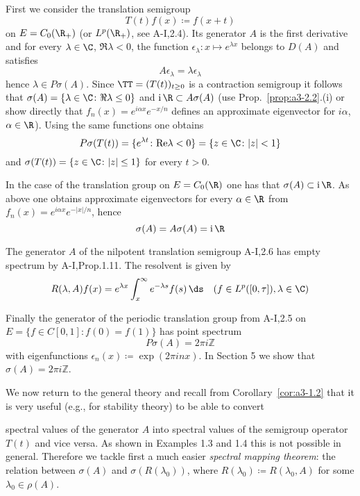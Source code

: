 First we consider the translation semigroup
\[
T(t)f(x) \coloneqq f(x+t)
\]
on $E = C_{0}(\R_{+})$ (or $L^{p}(\R_{+})$, see A-I,2.4).
Its generator $A$ is the first derivative and for every $\lambda \in \C$, $\Re\lambda < 0$, the function $\epsilon_{\lambda} \colon x \mapsto e^{\lambda x}$ belongs to $D(A)$ and satisfies
\[
A\epsilon_{\lambda} = \lambda\epsilon_{\lambda}
\]
hence $\lambda \in P\sigma(A)$.
Since $\TT = (T(t))_{t \geq 0}$ is a contraction semigroup it follows that $\sigma(A) = \{\lambda \in \C \colon \Re \lambda \leq 0\}$ and $\mathrm{i}\,\R \subset A\sigma(A)$ (use Prop.~\ref{prop:a3-2.2}.(i) or show directly that $f_{n}(x) = e^{i\alpha x}e^{-x/n}$ defines an approximate eigenvector for $i\alpha$, $\alpha \in \R$).
Using the same functions one obtains
\[
P\sigma(T(t)) = \{e^{\lambda t} \colon \text{Re}\lambda < 0\} = \{z \in \C \colon |z| < 1\}
\]
and $\sigma(T(t)) = \{z \in \C \colon |z| \leq 1\}$ for every $t > 0$.

In the case of the translation group on $E = C_{0}(\R)$ one has that $\sigma(A) \subset \mathrm{i}\,\R$.
As above one obtains approximate eigenvectors for every $\alpha \in \R$ from $f_{n}(x) = e^{i\alpha x}e^{-|x|/n}$, hence
\[
\sigma(A) = A\sigma(A) = \mathrm{i}\,\R
\]

The generator $A$ of the nilpotent translation semigroup A-I,2.6 has empty spectrum by A-I,Prop.1.11.
The resolvent is given by
\[
R(\lambda,A)f(x) = e^{\lambda x}\int_{x}^{\infty}e^{-\lambda s}f(s) \, \ds \quad (f \in L^{p}([0,\tau]), \lambda \in \C)
\]

Finally the generator of the periodic translation group from A-I,2.5 on $E = \{f \in C[0,1] \colon f(0) = f(1)\}$ has point spectrum
\[
P\sigma(A) = 2\pi i\mathbb{Z}
\]
with eigenfunctions $\epsilon_{n}(x) \coloneqq \exp(2\pi inx)$.
In Section 5 we show that $\sigma(A) = 2\pi i\mathbb{Z}$.

We now return to the general theory and recall from Corollary~\ref{cor:a3-1.2} that it is very useful (e.g., for stability theory) to be able to convert



\newpage
spectral values of the generator $A$ into spectral values of the semigroup operator $T(t)$ and vice versa.
As shown in Examples 1.3 and 1.4 this is not possible in general.
Therefore we tackle first a much easier \emph{spectral mapping theorem}: the relation between $\sigma(A)$ and $\sigma(R(\lambda_{0}))$, where $R(\lambda_{0}) \coloneqq R(\lambda_{0},A)$ for some $\lambda_{0} \in \rho(A)$.


